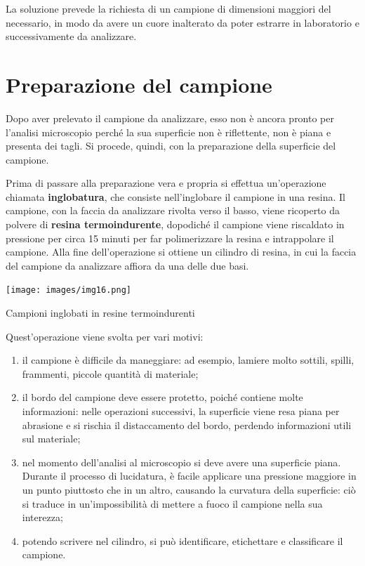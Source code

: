 La soluzione prevede la richiesta di un campione di dimensioni maggiori del necessario, in modo da avere un cuore inalterato da poter estrarre in laboratorio e successivamente da analizzare.

\section{Preparazione del campione}

Dopo aver prelevato il campione da analizzare, esso non è ancora pronto per l’analisi microscopio perché la sua superficie non è riflettente, non è piana e presenta dei tagli. Si procede, quindi, con la preparazione della superficie del campione.

Prima di passare alla preparazione vera e propria si effettua un’operazione chiamata \textbf{inglobatura}, che consiste nell’inglobare il campione in una resina. Il campione, con la faccia da analizzare rivolta verso il basso, viene ricoperto da polvere di \textbf{resina termoindurente}, dopodiché il campione viene riscaldato in pressione per circa 15 minuti per far polimerizzare la resina e intrappolare il campione. Alla fine dell’operazione si ottiene un cilindro di resina, in cui la faccia del campione da analizzare affiora da una delle due basi.
\begin{marginfigure}[-2.5cm]
\texttt{[image: images/img16.png]}
\caption{Campioni inglobati in resine termoindurenti}
\end{marginfigure}

Quest’operazione viene svolta per vari motivi:
\begin{enumerate}
    \item il campione è difficile da maneggiare: ad esempio, lamiere molto sottili, spilli, frammenti, piccole quantità di materiale;
\item il bordo del campione deve essere protetto, poiché contiene molte informazioni: nelle operazioni successivi, la superficie viene resa piana per abrasione e si rischia il distaccamento del bordo, perdendo informazioni utili sul materiale;
\item nel momento dell’analisi al microscopio si deve avere una superficie piana. Durante il processo di lucidatura, è facile applicare una pressione maggiore in un punto piuttosto che in un altro, causando la curvatura della superficie: ciò si traduce in un’impossibilità di mettere a fuoco il campione nella sua interezza;
\item potendo scrivere nel cilindro, si può identificare, etichettare e classificare il campione.
\end{enumerate}

